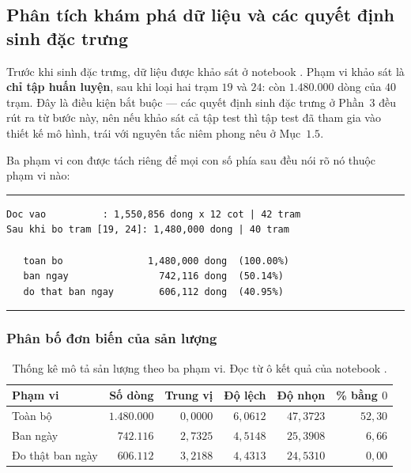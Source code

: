 \documentclass[12pt,a4paper]{article}
\DeclareRobustCommand{\tep}[1]{\texttt{\detokenize{#1}}}
\renewcommand{\baselinestretch}{1.35}
\begin{document}
\subsection{Phân tích khám phá dữ liệu và các quyết định sinh đặc trưng}

Trước khi sinh đặc trưng, dữ liệu được khảo sát ở notebook \tep{02_EDA}. Phạm vi khảo sát là
\textbf{chỉ tập huấn luyện}, sau khi loại hai trạm $19$ và $24$: còn $1.480.000$ dòng của
$40$ trạm. Đây là điều kiện bắt buộc --- các quyết định sinh đặc trưng ở Phần~$3$ đều rút ra
từ bước này, nên nếu khảo sát cả tập test thì tập test đã tham gia vào thiết kế mô hình,
trái với nguyên tắc niêm phong nêu ở Mục~$1.5$.

Ba phạm vi con được tách riêng để mọi con số phía sau đều nói rõ nó thuộc phạm vi nào:

\begingroup
\par\vspace{6pt}\hrule\vspace{4pt}
\small\renewcommand{\baselinestretch}{1.0}\selectfont
\begin{verbatim}
Doc vao          : 1,550,856 dong x 12 cot | 42 tram
Sau khi bo tram [19, 24]: 1,480,000 dong | 40 tram

   toan bo               1,480,000 dong  (100.00%)
   ban ngay                742,116 dong  (50.14%)
   do that ban ngay        606,112 dong  (40.95%)
\end{verbatim}
\vspace{2pt}\hrule\par\vspace{6pt}
\endgroup

\subsubsection{Phân bố đơn biến của sản lượng}

\begin{table}[htbp]
\centering
\caption{Thống kê mô tả sản lượng theo ba phạm vi. Đọc từ ô kết quả của notebook
\tep{02_EDA.ipynb}.}
\label{tab:eda_mo_ta}
\small
\begin{tabular}{l r r r r r}
\toprule
\textbf{Phạm vi} & \textbf{Số dòng} & \textbf{Trung vị} & \textbf{Độ lệch} & \textbf{Độ nhọn} & \textbf{\% bằng $0$} \\
\midrule
Toàn bộ          & $1.480.000$ & $0{,}0000$ & $6{,}0612$ & $47{,}3723$ & $52{,}30$ \\
Ban ngày         & $742.116$   & $2{,}7325$ & $4{,}5148$ & $25{,}3908$ & $6{,}66$ \\
Đo thật ban ngày & $606.112$   & $3{,}2188$ & $4{,}4313$ & $24{,}5310$ & $0{,}00$ \\
\bottomrule
\end{tabular}
\end{table}
\end{document}
